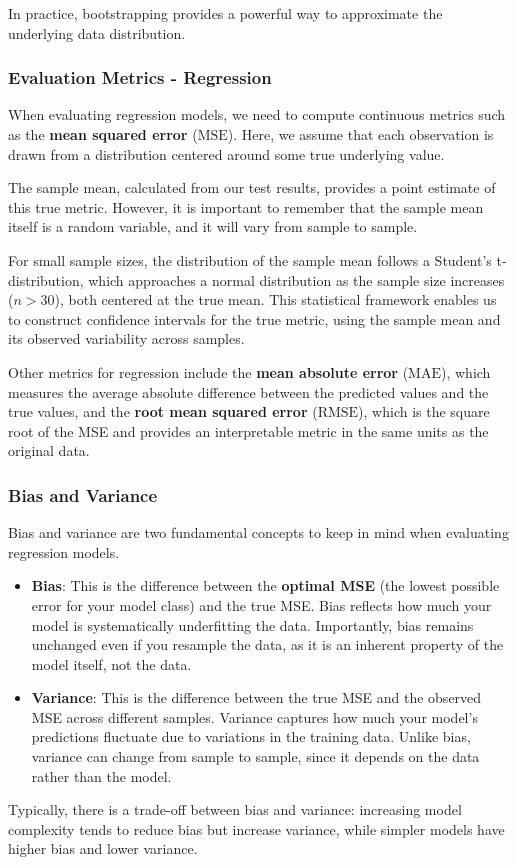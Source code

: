 In practice, bootstrapping provides a powerful way to approximate the underlying data distribution.

\subsubsection{Evaluation Metrics - Regression}
When evaluating regression models, we need to compute continuous metrics such as the \textbf{mean squared error} ($\text{MSE}$).
Here, we assume that each observation is drawn from a distribution centered around some true underlying value.

The sample mean, calculated from our test results, provides a point estimate of this true metric.
However, it is important to remember that the sample mean itself is a random variable, and it will vary from sample to sample.

For small sample sizes, the distribution of the sample mean follows a Student's t-distribution, which approaches a normal distribution 
as the sample size increases ($n > 30$), both centered at the true mean.
This statistical framework enables us to construct confidence intervals for the true metric, 
using the sample mean and its observed variability across samples.

Other metrics for regression include the \textbf{mean absolute error} ($\text{MAE}$), which measures the average absolute difference between the predicted values and the true values, 
and the \textbf{root mean squared error} ($\text{RMSE}$), which is the square root of the MSE and provides an interpretable metric in the same units as the original data.

\subsubsection*{Bias and Variance}
Bias and variance are two fundamental concepts to keep in mind when evaluating regression models.
\begin{itemize}
    \item \textbf{Bias}: This is the difference between the \textbf{optimal MSE} (the lowest possible error for your model class) and the true MSE.
    Bias reflects how much your model is systematically underfitting the data.
    Importantly, bias remains unchanged even if you resample the data, as it is an inherent property of the model itself, not the data.
    \item \textbf{Variance}: This is the difference between the true MSE and the observed MSE across different samples.
    Variance captures how much your model's predictions fluctuate due to variations in the training data.
    Unlike bias, variance can change from sample to sample, since it depends on the data rather than the model.
\end{itemize}
Typically, there is a trade-off between bias and variance: increasing model complexity tends to reduce bias but increase variance, 
while simpler models have higher bias and lower variance.

